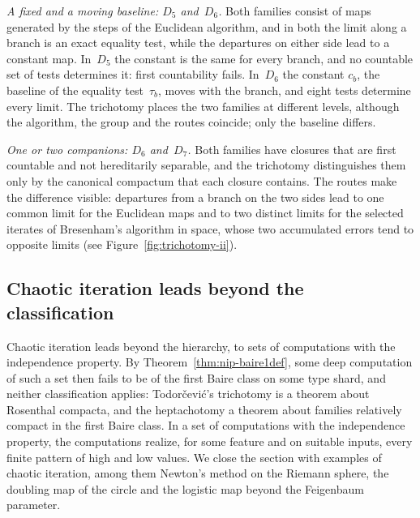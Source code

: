 \documentclass[psamsfonts]{amsart}
\theoremstyle{definition}
\theoremstyle{remark}
\numberwithin{equation}{section}
\begin{document}
\emph{A fixed and a moving baseline: $D_5$ and~$D_6$.}
Both families consist of maps generated by the steps of the Euclidean algorithm, and in both the limit along a branch is an exact equality test, while the departures on either side lead to a constant map.
In~$D_5$ the constant is the same for every branch, and no countable set of tests determines it: first countability fails.
In~$D_6$ the constant $c_b$, the baseline of the equality test~$\tau_b$, moves with the branch, and eight tests determine every limit.
The trichotomy places the two families at different levels, although the algorithm, the group and the routes coincide; only the baseline differs.

\emph{One or two companions: $D_6$ and~$D_7$.}
Both families have closures that are first countable and not hereditarily separable, and the trichotomy distinguishes them only by the canonical compactum that each closure contains.
The routes make the difference visible: departures from a branch on the two sides lead to one common limit for the Euclidean maps and to two distinct limits for the selected iterates of Bresenham's algorithm in space, whose two accumulated errors tend to opposite limits (see Figure~\ref{fig:trichotomy-ii}).


\subsection{Chaotic iteration leads beyond the classification}
\label{sec:beyond-NIP}
Chaotic iteration leads beyond the hierarchy, to sets of computations with the independence property.
By Theorem~\ref{thm:nip-baire1def}, some deep computation of such a set then fails to be of the first Baire class on some type shard, and neither classification applies: Todorčević's trichotomy is a theorem about Rosenthal compacta, and the heptachotomy a theorem about families relatively compact in the first Baire class.
In a set of computations with the independence property, the computations realize, for some feature and on suitable inputs, every finite pattern of high and
low values.
We close the section with examples of chaotic iteration, among them Newton’s method on the Riemann sphere, the doubling map of the circle and the logistic map beyond the Feigenbaum parameter.
\end{document}
